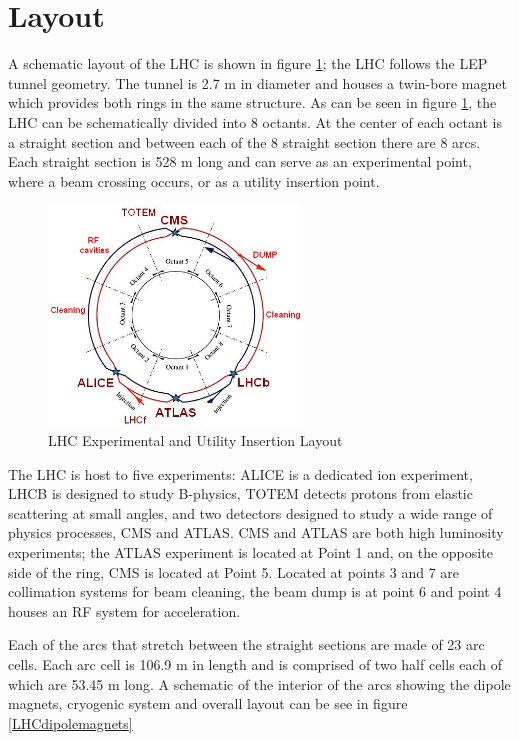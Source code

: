 \section{Layout}
A schematic layout of the LHC is shown in figure \ref{fig:LHCring};
the LHC follows the LEP tunnel geometry.
The tunnel is 2.7 m in diameter and houses a twin-bore magnet 
which provides both rings in the same structure.
As can be seen in figure \ref{fig:LHCring},
the LHC can be schematically divided 
into 8 octants. At the center of each octant is a straight section and between
each of the 8 straight section there are 8 arcs. Each straight section
is 528 m long and can serve as an experimental point, where a beam
crossing occurs, or as a utility insertion point.
\begin{figure}[t]
  \centering
	\includegraphics[width=0.6\textwidth]{images/LHCring.jpg}
  	\caption[LHCring]
   	{LHC Experimental and Utility Insertion Layout}
	\label{fig:LHCring}
\end{figure}
The LHC is host to five experiments: ALICE is a dedicated ion
experiment, LHCB is designed to study B-physics,
TOTEM detects protons from elastic scattering at small angles,
and two detectors designed to study a wide range of 
physics processes, CMS and ATLAS.
CMS and ATLAS are both high luminosity experiments;
the ATLAS experiment is located at Point 1 and, on the opposite side
of the ring, CMS is located at Point 5. 
Located at points 3 and 7 are collimation systems for beam cleaning,
the beam dump is at point 6 and point 4 houses an RF system for acceleration.

Each of the arcs that stretch between the straight sections
are made of 23 arc cells. Each arc cell is 106.9 m in length
and is comprised of two half cells each of which are 53.45 m long.
A schematic of the interior of the arcs showing the dipole magnets,
cryogenic system and overall layout can be see in figure \ref{LHCdipolemagnets}

